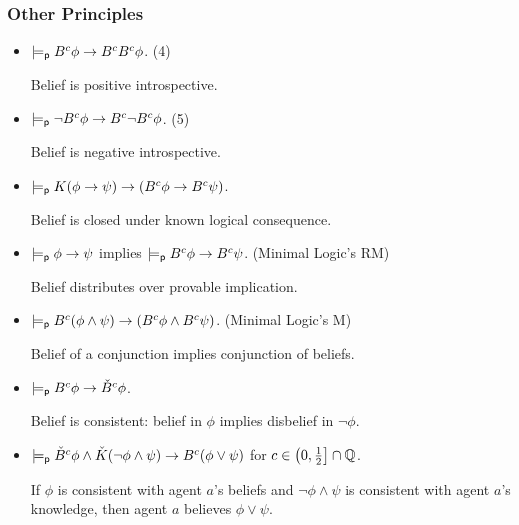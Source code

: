 \begin{frame}
  \frametitle{Other Principles}
  \begin{itemize}
  \item<+-> $\models_{\mathsf{p}} B^c\phi\to B^cB^c\phi$.
    \hfill(4)

    Belief is positive introspective.

  \item<+-> $\models_{\mathsf{p}} \lnot B^c\phi\to B^c\lnot B^c\phi$.  \hfill(5)

    Belief is negative introspective.

  \item<+-> $\models_{\mathsf{p}} K(\phi\to\psi)\to(B^c\phi\to B^c\psi)$.

    Belief is closed under known logical consequence.

  \item<+-> $\models_{\mathsf{p}} \phi\to\psi$ implies
    $\models_{\mathsf{p}} B^c\phi\to B^c\psi$.
    \hfill (Minimal Logic's RM)

    Belief distributes over provable implication.

  \item<+-> $\models_{\mathsf{p}} B^c(\phi\land\psi)\to
    (B^c\phi\land B^c\psi)$.
    \hfill(Minimal Logic's M)

    Belief of a conjunction implies conjunction of beliefs.

  \item<+-> $\models_{\mathsf{p}} B^c\phi\to \check B^c\phi$.

    Belief is consistent: belief in $\phi$ implies
    disbelief in $\lnot\phi$.

  \item<+-> $\models_{\mathsf{p}} \check{B}^c \phi \land \check{K}(\neg \phi \land
    \psi) \rightarrow B^c (\phi \lor \psi)$ for $c\in\left(0,\frac
      12\right]\cap\mathbb{Q}$.
    
    If $\phi$ is consistent with agent $a$'s beliefs and
    $\lnot\phi\land\psi$ is consistent with agent $a$'s knowledge,
    then agent $a$ believes $\phi\lor\psi$.
  \end{itemize}
\end{frame}

